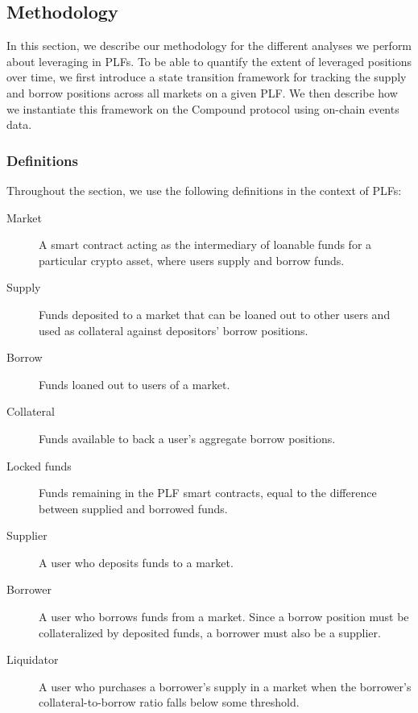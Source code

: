 \subsection{Methodology}
\label{sec:5b:methodology}

In this section, we describe our methodology for the different analyses we perform about leveraging in PLFs.
To be able to quantify the extent of leveraged positions over time, we first introduce a state transition framework for tracking the supply and borrow positions across all markets on a given PLF.
We then describe how we instantiate this framework on the Compound protocol using on-chain events data.

\subsubsection{Definitions}

Throughout the section, we use the following definitions in the context of PLFs:

\begin{description}
\item[Market] A smart contract acting as the intermediary of loanable funds for a particular crypto asset, where users supply and borrow funds. 

\item[Supply] Funds deposited to a market that can be loaned out to other users and used as collateral against depositors' borrow positions.

\item[Borrow] Funds loaned out to users of a market.

\item[Collateral] Funds available to back a user's aggregate borrow positions.

\item[Locked funds] Funds remaining in the PLF smart contracts, equal to the difference between supplied and borrowed funds.

\item[Supplier] A user who deposits funds to a market.

\item[Borrower] A user who borrows funds from a market. Since a borrow position must be collateralized by deposited funds, a borrower must also be a supplier.

\item[Liquidator] A user who purchases a borrower's supply in a market when the borrower's collateral-to-borrow ratio falls below some threshold.
\end{description}


